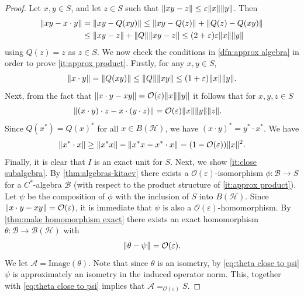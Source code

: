 \documentclass[11pt,reqno]{amsart}
\theoremstyle{definition}
\theoremstyle{remark}
\numberwithin{equation}{section}
\newcommand{\eps}{\varepsilon}
\newcommand{\cA}{\mathcal A}
\newcommand{\cB}{\mathcal B}
\newcommand{\cH}{\mathcal H}
\newcommand{\bigO}{\mathcal O}
\DeclarePairedDelimiter\norm{\lVert}{\rVert}
\newcommand{\approxEq}[1]{=_{#1}}
\begin{document}
\begin{proof}
    Let $x, y \in S$, and let $z \in S$ such that $\norm{xy - z} \leq \eps \norm{x}\norm{y}$.
    Then
    \begin{align*}
        \norm{xy - x \cdot y} & = \norm{xy - Q(xy)} \leq \norm{xy - Q(z)} + \norm{Q(z) - Q(xy)}                 \\
                              & \leq \norm{xy - z} + \norm{Q}\norm{xy - z} \leq (2 + \eps)\eps \norm{x}\norm{y}
    \end{align*}
    using $Q(z) = z$ as $z \in S$.
    We now check the conditions in \cref{dfn:approx algebra} in order to prove \ref{it:approx product}.
    Firstly, for any $x,y \in S$,
    \begin{align*}
        \norm{x \cdot y} = \norm{Q(xy)} \leq \norm{Q}\norm{xy} \leq (1 + \eps)\norm{x}\norm{y}.
    \end{align*}
    Next, from the fact that $\norm{x \cdot y - xy} = \bigO(\eps)\norm{x}\norm{y}$ it follows that for $x, y, z \in S$
    \begin{align*}
        \norm{(x \cdot y)\cdot z - x \cdot (y \cdot z)} & = \bigO(\eps)\norm{x}\norm{y}\norm{z}.
    \end{align*}
    Since $Q(x^*) = Q(x)^*$ for all $x \in B(\cH)$, we have $(x \cdot y)^* = y^* \cdot x^*$.
    We have
    \begin{align*}
        \norm{x^* \cdot x} \geq \norm{x^*x} - \norm{x^* x - x^* \cdot x} = (1 - \bigO(\eps))\norm{x}^2.
    \end{align*}
    Finally, it is clear that $I$ is an exact unit for $S$.
    Next, we show \ref{it:close subalgebra}.
    By \cref{thm:algebras-kitaev} there exists a $\bigO(\eps)$-isomorphism
    $\phi : \cB \to S$ for a $C^*$-algebra $\cB$ (with respect to the product structure of \ref{it:approx product}).
    Let $\psi$ be the composition of $\phi$ with the inclusion of $S$ into $B(\cH)$.
    Since $\norm{x \cdot y - xy} = \bigO(\eps)$, it is immediate that $\psi$ is also a $\bigO(\eps)$-homomorphism.
    By \cref{thm:make homomorphism exact} there exists an exact homomorphism $\theta : \cB \to \cB(\cH)$ with
    \begin{align}\label{eq:theta close to psi}
        \norm{\theta - \psi} = \bigO(\eps).
    \end{align}
    We let $\cA = \mathrm{Image}(\theta)$.
    Note that since $\theta$ is an isometry, by \cref{eq:theta close to psi} $\psi$ is approximately an isometry in the induced operator norm.
    This, together with \cref{eq:theta close to psi} implies that $\cA \approxEq{\bigO(\eps)} S$.  
\end{proof}
\end{document}
